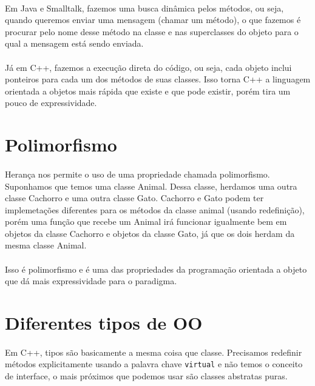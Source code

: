 \documentclass[11pt]{article}
\begin{document}
\paragraph{} Em Java e Smalltalk, fazemos uma busca dinâmica pelos métodos, ou seja, quando queremos enviar uma mensagem (chamar um
método), o que fazemos é procurar pelo nome desse método na classe e nas superclasses do objeto para o qual a mensagem está sendo enviada.

\paragraph{} Já em C++, fazemos a execução direta do código, ou seja, cada objeto inclui ponteiros para cada um dos métodos de suas
classes. Isso torna C++ a linguagem orientada a objetos mais rápida que existe e que pode existir, porém tira um pouco de expressividade.

\section{Polimorfismo}
\label{sec:org0125a8f}
\paragraph{} Herança nos permite o uso de uma propriedade chamada polimorfismo. Suponhamos que temos uma classe Animal. Dessa classe,
herdamos uma outra classe Cachorro e uma outra classe Gato. Cachorro e Gato podem ter implemetações diferentes para os métodos da classe
animal (usando redefinição), porém uma função que recebe um Animal irá funcionar igualmente bem em objetos da classe Cachorro e objetos da
classe Gato, já que os dois herdam da mesma classe Animal.

\paragraph{} Isso é polimorfismo e é uma das propriedades da programação orientada a objeto que dá mais expressividade para o paradigma.

\section{Diferentes tipos de OO}
\label{sec:orga3ee995}
\paragraph{} Em C++, tipos são basicamente a mesma coisa que classe. Precisamos redefinir métodos explicitamente usando a palavra chave
\texttt{virtual} e não temos o conceito de interface, o mais próximos que podemos usar são classes abstratas puras.
\end{document}
